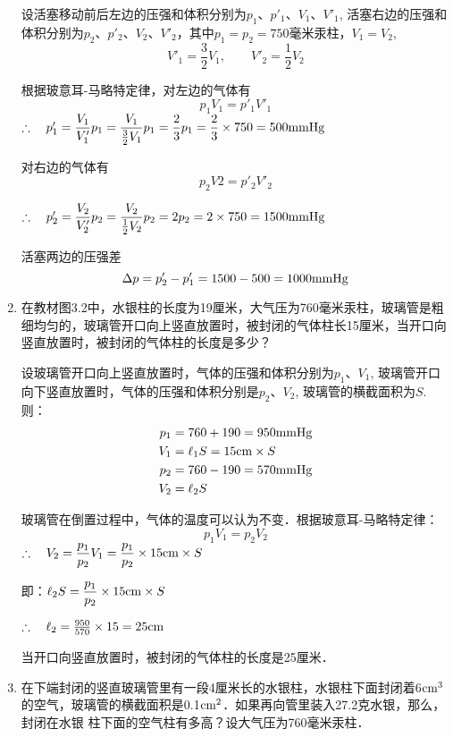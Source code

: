 \begin{enumerate}
\begin{solution}
设活塞移动前后左边的压强和体积分别为$p_1$、$p'_1$、$V_1$、$V'_1$, 活塞右边的压强和体积分别为$p_2$、$p'_2$、$V_2$、$V'_2$，其中$p_1=p_2=750$毫米汞柱，$V_1=V_2$,
\[V'_1=\frac{3}{2}V_1,\qquad V'_2=\frac{1}{2}V_2\]

根据玻意耳-马略特定律，对左边的气体有
    \[p_1V_1=p'_1V'_1\]
$\therefore\quad p'_1=\dfrac{V_1}{V'_1}p_1=\dfrac{V_1}{\frac{3}{2}V_1}p_1=\dfrac{2}{3}p_1=\dfrac{2}{3}\times 750=500{\rm mmHg}$
    
    对右边的气体有
    \[p_2V2=p'_2V'_2\]
    
$\therefore\quad p'_2=\dfrac{V_2}{V'_2}p_2=\dfrac{V_2}{\frac{1}{2}V_2}p_2=2p_2=2\times 750=1500{\rm mmHg}$
    
    活塞两边的压强差
\[\Delta p=p'_2-p'_1=1500-500=1000{\rm mmHg}\]
    
\end{solution}

	\item 在教材图3.2中，水银柱的长度为19厘米，大气压为760毫米汞柱，玻璃管是粗细均匀的，玻璃管开口向上竖直放置时，被封闭的气体柱长15厘米，当开口向竖直放置时，被封闭的气体柱的长度是多少？
	
\begin{solution}  
设玻璃管开口向上竖直放置时，气体的压强和体积分别为$p_1$、$V_1$, 玻璃管开口向下竖直放置时，气体的压强和体积分别是$p_2$、$V_2$, 玻璃管的横截面积为$S$.
    则：
\[\begin{split}
      p_1&=760+190=950{\rm mmHg}\\
    V_1&=\ell_1S=15{\rm cm}\times S\\
    p_2&=760-190=570{\rm mmHg}\\
    V_2&=\ell_2S  
\end{split}\]    
    
玻璃管在倒置过程中，气体的温度可以认为不变．根据玻意耳-马略特定律：
\[p_1V_1=p_2V_2\]
$\therefore\quad V_2=\dfrac{p_1}{p_2}V_1=\dfrac{p_1}{p_2}\times 15{\rm cm}\times S$

即：$\ell_2S=\dfrac{p_1}{p_2}\times 15{\rm cm}\times S$

$\therefore\quad \ell_2=\frac{950}{570}\times 15=25{\rm cm}$

当开口向竖直放置时，被封闭的气体柱的长度是25厘米．
\end{solution}  
	\item 在下端封闭的竖直玻璃管里有一段4厘米长的水银柱，水银柱下面封闭着6${\rm cm^3}$的空气，玻璃管的横截面积是0.1${\rm cm^2}$．如果再向管里装入27.2克水银，那么，封闭在水银
 柱下面的空气柱有多高？设大气压为760毫米汞柱．


\end{enumerate}
